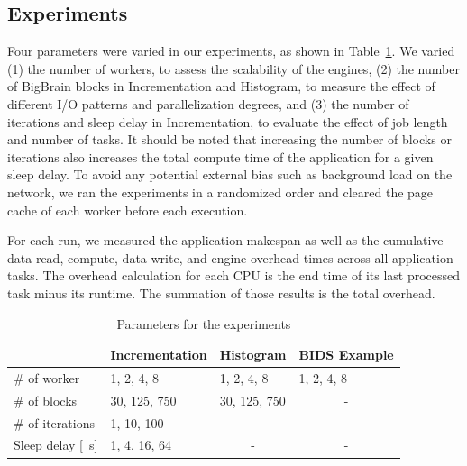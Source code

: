 \documentclass[conference]{IEEEtran}
\begin{document}
\subsection{Experiments}

Four parameters were varied in our experiments, as shown in
Table~\ref{tab:param}. We varied (1) the number of workers, to assess the
scalability of the engines, (2) the number of BigBrain blocks in
Incrementation and Histogram, to measure the effect of different I/O patterns
and parallelization degrees, and (3) the number of iterations and sleep
delay in Incrementation, to evaluate the effect of job length and number of
tasks.
It should be noted that increasing the number of blocks or iterations also
increases the total compute time of the application for a given sleep
delay. To avoid any potential external bias such as background load on the
network, we ran the experiments in a randomized order and cleared the page
cache of each worker before each execution.

For each run, we measured the application makespan as well as the cumulative 
data read, compute, data write, and engine overhead times across all application
tasks. 
The overhead calculation for each CPU is the end time of its last processed task
minus its runtime. The summation of those results is the
total overhead.


\begin{table}[!t]
    \renewcommand{\arraystretch}{1.3}
    \caption{Parameters for the experiments}\label{tab:param}
    \centering
    \begin{tabular*}{\columnwidth}{llll}
    \hline
                        & Incrementation & Histogram             & BIDS Example          \\ \hline
    \# of worker        & 1, 2, 4, 8     & 1, 2, 4, 8            & 1, 2, 4, 8            \\
    \# of blocks        & 30, 125, 750   & 30, 125, 750          & \multicolumn{1}{c}{-} \\
    \# of iterations    & 1, 10, 100     & \multicolumn{1}{c}{-} & \multicolumn{1}{c}{-} \\
    Sleep delay {[}\SI{}{\second}{]} & 1, 4, 16, 64   & \multicolumn{1}{c}{-} & \multicolumn{1}{c}{-} \\ \hline
    \end{tabular*}
    \end{table}
\end{document}
